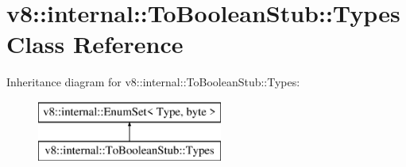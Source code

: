 \hypertarget{classv8_1_1internal_1_1_to_boolean_stub_1_1_types}{}\section{v8\+:\+:internal\+:\+:To\+Boolean\+Stub\+:\+:Types Class Reference}
\label{classv8_1_1internal_1_1_to_boolean_stub_1_1_types}
Inheritance diagram for v8\+:\+:internal\+:\+:To\+Boolean\+Stub\+:\+:Types\+:\begin{figure}[H]
\begin{center}
\leavevmode
\includegraphics[height=2.000000cm]{classv8_1_1internal_1_1_to_boolean_stub_1_1_types}
\end{center}
\end{figure}

